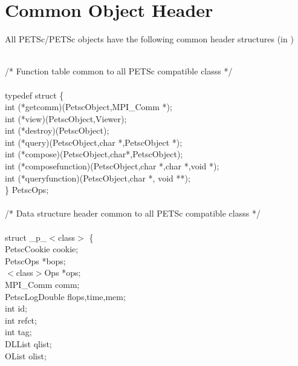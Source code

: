 \documentclass[twoside,12pt]{../sty/report_petsc}
\begin{document}
\section{Common Object Header}

All PETSc/PETSc objects have the following common header structures
(in )

\begin{tabbing}
\\
/* Function table common to all PETSc compatible classs */\\
\\
typedef struct \{ \\
   int (*getcomm)(PetscObject,MPI\_Comm *);\\
   int (*view)(PetscObject,Viewer);\\
   int (*destroy)(PetscObject);\\
   int (*query)(PetscObject,char *,PetscObject *);\\
   int (*compose)(PetscObject,char*,PetscObject);\\
   int (*composefunction)(PetscObject,char *,char *,void *);\\
   int (*queryfunction)(PetscObject,char *, void **);\\
\} PetscOps;\\
\\
/* Data structure header common to all PETSc compatible classs */\\
\\
struct \_p\_$<$class$>$ \{\\
  PetscCookie      cookie;                                  \\
  PetscOps         *bops;                                   \\
  $<$class$>$Ops   *ops;                                    \\
  MPI\_Comm         comm;                                    \\
  PetscLogDouble  flops,time,mem;                          \\
  int              id;                                      \\
  int              refct;                                   \\
  int              tag;                                     \\
  DLList           qlist;                                   \\
  OList            olist;                                   \\

\end{tabbing}
\end{document}
